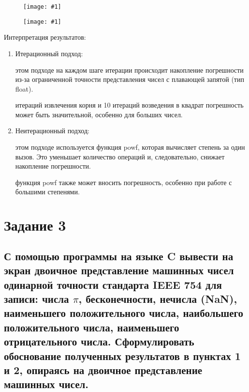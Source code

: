 \documentclass{report}
\newcommand{\drawzalupa}[2]{
	\begin{figure}[H]
		\centering
		\texttt{[image: \#1]}
	\end{figure}
}
\begin{document}
	\drawzalupa{images/task2.png}{1}
	\drawzalupa{images/task21.png}{1}
	
	Интерпретация результатов:
	
	\begin{enumerate}
	\item{Итерационный подход:}
	\begin{itemize}
	 этом подходе на каждом шаге итерации происходит накопление погрешности из-за ограниченной точности представления чисел с плавающей запятой (тип float).
	
	 итераций извлечения корня и 10 итераций возведения в квадрат погрешность может быть значительной, особенно для больших чисел.
	\end{itemize}
	\item{Неитерационный подход:}
	\begin{itemize}
	 этом подходе используется функция powf, которая вычисляет степень за один вызов. Это уменьшает количество операций и, следовательно, снижает накопление погрешности.
	
	 функция powf также может вносить погрешность, особенно при работе с большими степенями.
	\end{itemize}
	\end{enumerate}
	
	\chapter{Задание 3}
	
	\section{С помощью программы на языке C вывести на экран двоичное представление машинных
		чисел одинарной точности стандарта IEEE 754 для записи: числа $\pi$, бесконечности, нечисла
		(NaN), наименьшего положительного числа, наибольшего положительного числа,
		наименьшего отрицательного числа. Сформулировать обоснование полученных результатов в
		пунктах 1 и 2, опираясь на двоичное представление машинных чисел.}
	
\end{document}

